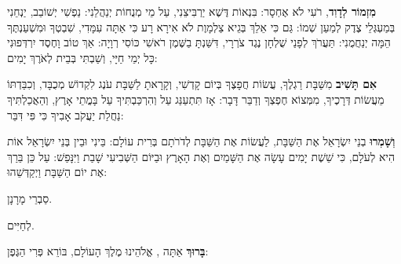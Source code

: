 
\label{kiddush-shabbat-day}

\textbf{מִזְמוֹר לְדָוִד}, \Shem{} רֹעִי לֹא אֶחְסָר: בִּנְאוֹת דֶּשֶׁא יַרְבִּיצֵנִי, עַל מֵי מְנֻחוֹת יְנַהֲלֵנִי: נַפְשִׁי יְשׁוֹבֵב, יַנְחֵנִי בְּמַעְגְּלֵי צֶדֶק לְמַעַן שְׁמוֹ: גַּם כִּי אֵלֵךְ בְּגֵיא צַלְמָוֶת לֹא אִירָא רָע כִּי אַתָּה עִמָּדִי, שִׁבְטְךָ וּמִשְׁעַנְתֶּךָ הֵמָּה יְנַחֲמֻנִי: תַּעֲרֹךְ לְפָנַי שֻׁלְחָן נֶגֶד צֹרְרָי, דִּשַּׁנְתָּ בַשֶּׁמֶן רֹאשִׁי כּוֹסִי רְוָיָה: אַךְ טוֹב וָחֶסֶד יִרְדְּפוּנִי כָּל יְמֵי חַיָּי, וְשַׁבְתִּי בְּבֵית \Shem{} לְאֹרֶךְ יָמִים:

\textbf{אִם תָּשִׁיב} מִשַּׁבָּת רַגְלֶךָ, עֲשׂוֹת חֲפָצֶךָ בְּיוֹם קָדְשִׁי, וְקָרָאתָ לַשַּׁבָּת עֹנֶג לִקְדוֹשׁ \Shem{} מְכֻבָּד, וְכִבַּדְתּוֹ מֵעֲשׂוֹת דְּרָכֶיךָ, מִמְּצוֹא חֶפְצְךָ וְדַבֵּר דָּבָר: אָז תִּתְעַנַּג עַל \Shem{} וְהִרְכַּבְתִּיךָ עַל בָּמֳתֵי אָרֶץ, וְהַאֲכַלְתִּיךָ נַחֲלַת יַעֲקֹב אָבִיךָ כִּי פִּי \Shem{} דִּבֵּר:

\textbf{וְשָׁמְרוּ} בְנֵי יִשְׂרָאֵל אֶת הַשַּׁבָּת, לַעֲשׂוֹת אֶת הַשַּׁבָּת לְדֹרֹתָם בְּרִית עוֹלָם: בֵּינִי וּבֵין בְּנֵי יִשְׂרָאֵל אוֹת הִיא לְעֹלָם, כִּי שֵׁשֶׁת יָמִים עָשָׂה \Shem{} אֶת הַשָּׁמַיִם וְאֶת הָאָרֶץ וּבַיּוֹם הַשְּׁבִיעִי שָׁבַת וַיִּנָּפַשׁ: עַל כֵּן בֵּרַךְ \Shem{} אֶת יוֹם הַשַּׁבָּת וַיְקַדְּשֵׁהוּ:

סַבְרֵי מָרָנָן.

לְחַיִּים.

\textbf{בָּרוּךְ} אַתָּה \Shem{}, אֱלֹהֵינוּ מֶלֶךְ הָעוֹלָם, בּוֹרֵא פְּרִי הַגֶּפֶן:

